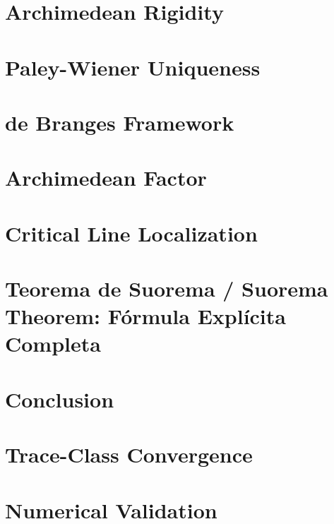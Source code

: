 \documentclass[12pt]{article}
\begin{document}
\section{Archimedean Rigidity}


\section{Paley-Wiener Uniqueness}


\section{de Branges Framework}


\section{Archimedean Factor}


\section{Critical Line Localization}


\section{Teorema de Suorema / Suorema Theorem: Fórmula Explícita Completa}


\section{Conclusion}


\appendix

\section{Trace-Class Convergence}


\section{Numerical Validation}

\end{document}
